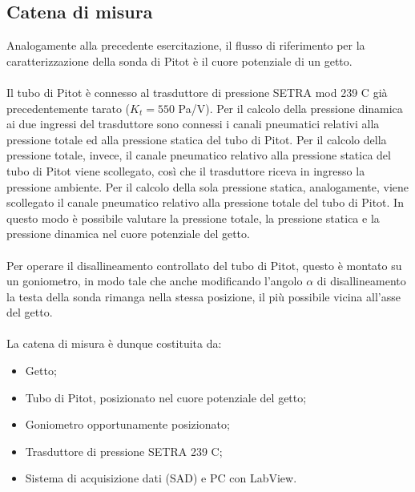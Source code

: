 \subsection{Catena di misura}
Analogamente alla precedente esercitazione, il flusso di riferimento per la caratterizzazione della sonda di Pitot è il cuore potenziale di un getto.\\\\
Il tubo di Pitot è connesso al trasduttore di pressione SETRA mod 239 C già precedentemente tarato ($K_t=550$ Pa/V). Per il calcolo della pressione dinamica ai due ingressi del trasduttore sono connessi i canali pneumatici relativi alla pressione totale ed alla pressione statica del tubo di Pitot. Per il calcolo della pressione totale, invece, il canale pneumatico relativo alla pressione statica del tubo di Pitot viene scollegato, così che il trasduttore riceva in ingresso la pressione ambiente. Per il calcolo della sola pressione statica, analogamente, viene scollegato il canale pneumatico relativo alla pressione totale del tubo di Pitot. In questo modo è possibile valutare la pressione totale, la pressione statica e la pressione dinamica nel cuore potenziale del getto.\\\\
Per operare il disallineamento controllato del tubo di Pitot, questo è montato su un goniometro, in modo tale che anche modificando l'angolo $\alpha$ di disallineamento la testa della sonda rimanga nella stessa posizione, il più possibile vicina all'asse del getto.\\\\
La catena di misura è dunque costituita da:
\begin{itemize}
    \item Getto;
    \item Tubo di Pitot, posizionato nel cuore potenziale del getto;
    \item Goniometro opportunamente posizionato;
    \item Trasduttore di pressione SETRA 239 C;
    \item Sistema di acquisizione dati (SAD) e PC con LabView.
\end{itemize}

